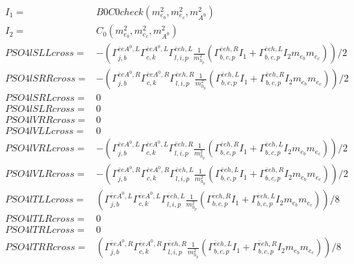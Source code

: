\documentclass[A4,landscape]{article}
\begin{document}
\begin{align} 
I_1= & B0C0check(m^2_{e_{{b}}}, m^2_{e_{{c}}}, m^2_{A^0}) \\ 
I_2= & C_0(m^2_{e_{{b}}}, m^2_{e_{{c}}}, m^2_{A^0}) \\ 
  PSO4lSLLcross= & -( \Gamma^{\bar{e}e A^0 ,L}_{j, b} \Gamma^{\bar{e}e A^0 ,L}_{c, k} \Gamma^{\bar{e}e h ,L}_{l, i, p} \frac{1}{m^2_{h_{{p}}}} (\Gamma^{\bar{e}e h ,R}_{b, c, p} I_1 + \Gamma^{\bar{e}e h ,L}_{b, c, p} I_2 m_{e_{{b}}} m_{e_{{c}}}))/2 \\ 
  PSO4lSRRcross= & -( \Gamma^{\bar{e}e A^0 ,R}_{j, b} \Gamma^{\bar{e}e A^0 ,R}_{c, k} \Gamma^{\bar{e}e h ,R}_{l, i, p} \frac{1}{m^2_{h_{{p}}}} (\Gamma^{\bar{e}e h ,L}_{b, c, p} I_1 + \Gamma^{\bar{e}e h ,R}_{b, c, p} I_2 m_{e_{{b}}} m_{e_{{c}}}))/2 \\ 
  PSO4lSRLcross= & 0 \\ 
  PSO4lSLRcross= & 0 \\ 
  PSO4lVRRcross= & 0 \\ 
  PSO4lVLLcross= & 0 \\ 
  PSO4lVRLcross= & -( \Gamma^{\bar{e}e A^0 ,L}_{j, b} \Gamma^{\bar{e}e A^0 ,L}_{c, k} \Gamma^{\bar{e}e h ,R}_{l, i, p} \frac{1}{m^2_{h_{{p}}}} (\Gamma^{\bar{e}e h ,R}_{b, c, p} I_1 + \Gamma^{\bar{e}e h ,L}_{b, c, p} I_2 m_{e_{{b}}} m_{e_{{c}}}))/2 \\ 
  PSO4lVLRcross= & -( \Gamma^{\bar{e}e A^0 ,R}_{j, b} \Gamma^{\bar{e}e A^0 ,R}_{c, k} \Gamma^{\bar{e}e h ,L}_{l, i, p} \frac{1}{m^2_{h_{{p}}}} (\Gamma^{\bar{e}e h ,L}_{b, c, p} I_1 + \Gamma^{\bar{e}e h ,R}_{b, c, p} I_2 m_{e_{{b}}} m_{e_{{c}}}))/2 \\ 
  PSO4lTLLcross= & ( \Gamma^{\bar{e}e A^0 ,L}_{j, b} \Gamma^{\bar{e}e A^0 ,L}_{c, k} \Gamma^{\bar{e}e h ,L}_{l, i, p} \frac{1}{m^2_{h_{{p}}}} (\Gamma^{\bar{e}e h ,R}_{b, c, p} I_1 + \Gamma^{\bar{e}e h ,L}_{b, c, p} I_2 m_{e_{{b}}} m_{e_{{c}}}))/8 \\ 
  PSO4lTLRcross= & 0 \\ 
  PSO4lTRLcross= & 0 \\ 
  PSO4lTRRcross= & ( \Gamma^{\bar{e}e A^0 ,R}_{j, b} \Gamma^{\bar{e}e A^0 ,R}_{c, k} \Gamma^{\bar{e}e h ,R}_{l, i, p} \frac{1}{m^2_{h_{{p}}}} (\Gamma^{\bar{e}e h ,L}_{b, c, p} I_1 + \Gamma^{\bar{e}e h ,R}_{b, c, p} I_2 m_{e_{{b}}} m_{e_{{c}}}))/8 \\ 
\end{align} 
\end{document}
